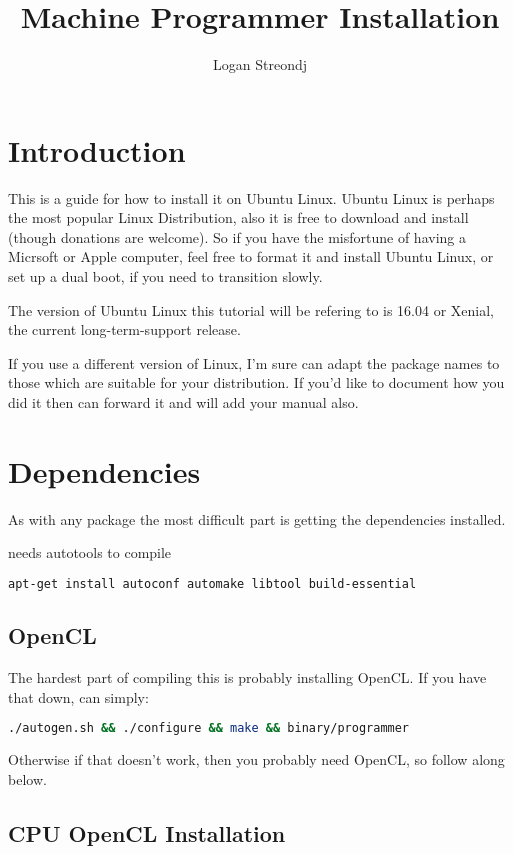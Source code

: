 \documentclass[12pt]{article}
\title{Machine Programmer Installation}
\author{Logan Streondj}
\begin{document}
\maketitle
\tableofcontents
\section{Introduction}
This is a guide for how to install it on Ubuntu Linux.
Ubuntu Linux is perhaps the most popular Linux Distribution,
also it is free to download and install (though donations are welcome).
So if you have the misfortune of having a Micrsoft or Apple computer, 
feel free to format it and install Ubuntu Linux,
or set up a dual boot, if you need to transition slowly.  

The version of Ubuntu Linux this tutorial will be refering to is 16.04 or
Xenial, the current long-term-support release. 

If you use a different version of Linux, I'm sure can adapt the package names to
those which are suitable for your distribution.  If you'd like to document how
you did it then can forward it and will add your manual also.

\section{Dependencies}
As with any package the most difficult part is getting the dependencies
installed.

needs autotools to compile
\begin{lstlisting}[language=bash]
apt-get install autoconf automake libtool build-essential
\end{lstlisting}

\subsection{OpenCL}
The hardest part of compiling this is probably installing OpenCL.
If you have that down, can simply:
\begin{lstlisting}[language=bash]
./autogen.sh && ./configure && make && binary/programmer
\end{lstlisting}

Otherwise if that doesn't work, then you probably need OpenCL,
so follow along below.

\subsection{CPU OpenCL Installation}
\end{document}

